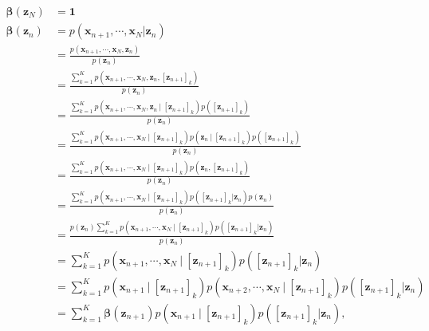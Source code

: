 \documentclass[a4]{article}
\begin{document}
\begin{equation}
\begin{aligned}
\bm{\beta}(\bm{z}_N) &= \bm{1}\\
\bm{\beta}(\bm{z}_n) &= p(\bm{x}_{n+1}, \cdots, \bm{x}_N | \bm{z}_n)\\
                     &= \frac{p(\bm{x}_{n+1}, \cdots, \bm{x}_N , \bm{z}_n)}{p(\bm{z}_n)}\\
                     &= \frac{
                          \sum_{k=1}^K p(\bm{x}_{n+1}, \cdots, \bm{x}_N , \bm{z}_n, [\bm{z}_{n+1}]_k)
                        }{p(\bm{z}_n)}\\
                     &= \frac{
                          \sum_{k=1}^K  p(\bm{x}_{n+1}, \cdots, \bm{x}_N , \bm{z}_n \:|\: [\bm{z}_{n+1}]_k)
                          p( [\bm{z}_{n+1}]_k )
                        }{p(\bm{z}_n)}\\
                     &= \frac{
                          \sum_{k=1}^K
                              p( \bm{x}_{n+1}, \cdots, \bm{x}_N \:|\: [\bm{z}_{n+1}]_k )
                              p( \bm{z}_n \:|\: [\bm{z}_{n+1}]_k )
                              p( [\bm{z}_{n+1}]_k )
                        }{p(\bm{z}_n)}\\
                     &= \frac{
                          \sum_{k=1}^K
                              p( \bm{x}_{n+1}, \cdots, \bm{x}_N \:|\: [\bm{z}_{n+1}]_k )
                              p( \bm{z}_n, [\bm{z}_{n+1}]_k )
                        }{p(\bm{z}_n)}\\
                     &= \frac{
                          \sum_{k=1}^K
                              p( \bm{x}_{n+1}, \cdots, \bm{x}_N \:|\: [\bm{z}_{n+1}]_k )
                              p( [\bm{z}_{n+1}]_k |\bm{z}_n )  p(\bm{z}_n )
                        }{p(\bm{z}_n)}\\
                     &= \frac{
                            p(\bm{z}_n )\sum_{k=1}^K
                              p( \bm{x}_{n+1}, \cdots, \bm{x}_N \:|\: [\bm{z}_{n+1}]_k )
                              p( [\bm{z}_{n+1}]_k |\bm{z}_n )
                        }{p(\bm{z}_n)}\\
                     &=
                        \sum_{k=1}^K
                              p( \bm{x}_{n+1}, \cdots, \bm{x}_N \:|\: [\bm{z}_{n+1}]_k )
                              p( [\bm{z}_{n+1}]_k |\bm{z}_n )\\
                     &=
                        \sum_{k=1}^K
                              p( \bm{x}_{n+1} \:|\: [\bm{z}_{n+1}]_k )
                              p( \bm{x}_{n+2}, \cdots, \bm{x}_N \:|\: [\bm{z}_{n+1}]_k )
                              p( [\bm{z}_{n+1}]_k |\bm{z}_n )\\
                     &=
                        \sum_{k=1}^K
                              \bm{\beta}(\bm{z}_{n+1})
                              p( \bm{x}_{n+1} \:|\: [\bm{z}_{n+1}]_k )
                              p( [\bm{z}_{n+1}]_k |\bm{z}_n )\label{eq:definition_beta},\\
\end{aligned}
\end{equation}
\end{document}
